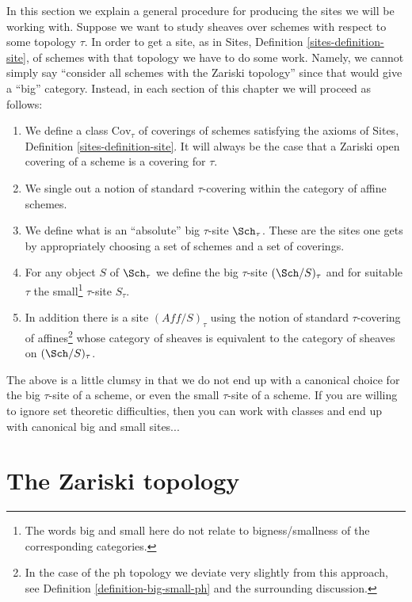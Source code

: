 \noindent
In this section we explain a general procedure for producing the
sites we will be working with. Suppose we want to study sheaves
over schemes with respect to some topology $\tau$. In order to
get a site, as in Sites, Definition \ref{sites-definition-site},
of schemes with that topology we have to do some work. Namely,
we cannot simply say ``consider all schemes with the Zariski topology''
since that would give a ``big'' category. Instead, in each section of
this chapter we will proceed as follows:
\begin{enumerate}
\item We define a class $\text{Cov}_\tau$ of coverings of schemes
satisfying the axioms of Sites, Definition \ref{sites-definition-site}.
It will always be the case that a Zariski open covering of
a scheme is a covering for $\tau$.
\item We single out a notion of standard
$\tau$-covering within the category of affine schemes.
\item We define what is an ``absolute'' big $\tau$-site $\Sch_\tau$.
These are the sites one gets by appropriately choosing a set of schemes
and a set of coverings.
\item For any object $S$ of $\Sch_\tau$
we define the big $\tau$-site $(\Sch/S)_\tau$ and for suitable
$\tau$ the small\footnote{The words big and
small here do not relate to bigness/smallness of the corresponding
categories.} $\tau$-site $S_\tau$.
\item In addition there is a site $(\textit{Aff}/S)_\tau$ using the
notion of standard $\tau$-covering of affines\footnote{In the case
of the ph topology we deviate very slightly from this approach, see
Definition \ref{definition-big-small-ph} and the surrounding discussion.}
whose category of sheaves
is equivalent to the category of sheaves on $(\Sch/S)_\tau$.
\end{enumerate}
The above is a little clumsy in that we do not end up with a canonical
choice for the big $\tau$-site of a scheme, or even the small
$\tau$-site of a scheme. If you are willing to ignore set theoretic
difficulties, then you can work with classes and end up with
canonical big and small sites...







\section{The Zariski topology}
\label{section-zariski}


